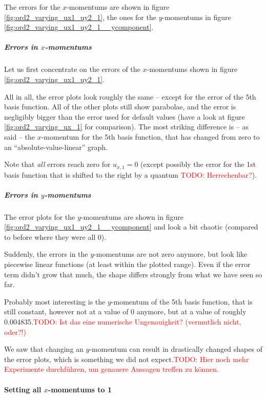 \documentclass{article}
\newcommand{\todo}[1]{\textcolor{red}{TODO: #1}}
\begin{document}
The errors for the $x$-momentums are shown in figure \ref{fig:ord2_varying_ux1_uy2_1}, the ones for the $y$-momentums in figure \ref{fig:ord2_varying_ux1_uy2_1__ycomponent}.

\subparagraph{Errors in $x$-momentums}

Let us first concentrate on the errors of the $x$-momentums shown in figure \ref{fig:ord2_varying_ux1_uy2_1}.



All in all, the error plots look roughly the same -- except for the error of the 5th basis function. All of the other plots still show parabolae, and the error is negligibly bigger than the error used for default values (have a look at figure \ref{fig:ord2_varying_ux_1} for comparison). The most striking difference is -- as said -- the $x$-momentum for the 5th basis function, that has changed from zero to an ``absolute-value-linear'' graph.

Note that \emph{all} errors reach zero for $u_{x,1}=0$ (except possibly the error for the 1st basis function that is shifted to the right by a quantum \todo{Herrechenbar?}).

\subparagraph{Errors in $y$-momentums}

The error plots for the $y$-momentums are shown in figure \ref{fig:ord2_varying_ux1_uy2_1__ycomponent} and look a bit chaotic (compared to before where they were all 0).



Suddenly, the errors in the $y$-momentums are not zero anymore, but look like piecewise linear functions (at least within the plotted range). Even if the error term didn't grow that much, the shape differs strongly from what we have seen so far.

Probably most interesting is the $y$-momentum of the 5th basis function, that is still constant, however not at a value of 0 anymore, but at a value of roughly 0.004835.\todo{Ist das eine numerische Ungenauigkeit? (vermutlich nicht, oder?!)}

We saw that changing an $y$-momentum can result in drastically changed shapes of the error plots,  which is something we did not expect.\todo{Hier noch mehr Experimente durchführen, um genauere Aussagen treffen zu können.}

\paragraph{Setting all $x$-momentums to 1}
\end{document}
